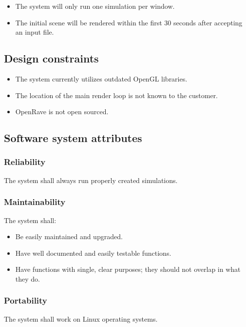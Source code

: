 \documentclass[10pt,journal,compsoc]{IEEEtran}
\begin{document}
\begin{flushleft}
\begin{itemize}
\begin{itemize}
\end{itemize}
\item The system will only run one simulation per window.
\item The initial scene will be rendered within the first 30 seconds after accepting an input file.
\end{itemize}

\subsection{Design constraints}
\vspace{3mm}
\begin{itemize}
\item The system currently utilizes outdated OpenGL libraries.
\item The location of the main render loop is not known to the customer.
\item OpenRave is not open sourced.
\end{itemize}


\subsection{Software system attributes}
\vspace{3mm}
\subsubsection{Reliability}
\vspace{5mm}
The system shall always run properly created simulations.


\subsubsection{Maintainability}
\vspace{3mm}
The system shall:
\begin{itemize}
\item Be easily maintained and upgraded. 
\item Have well documented and easily testable functions.
\item Have functions with single, clear purposes; they should not overlap in what they do.
\end{itemize}

\subsubsection{Portability}
\vspace{3mm}
The system shall work on Linux operating systems.


\end{flushleft}
\end{document}
